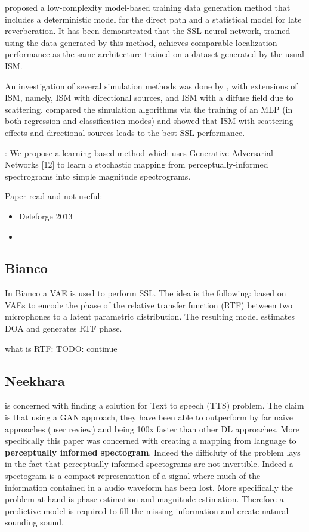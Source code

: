 \documentclass{article}
\begin{document}
\cite{hubner2021efficient} proposed a low-complexity model-based training data generation method that includes a deterministic model for the direct path and a statistical model for late reverberation. It has been demonstrated that the SSL neural network, trained using the data generated by this method, achieves comparable localization performance as the same architecture trained on a dataset generated by the usual ISM.

An investigation of several simulation methods was done by \cite{gelderblom2021synthetic}, with extensions of ISM, namely, ISM with directional sources, and ISM with a diffuse field due to scattering. \cite{gelderblom2021synthetic} compared the simulation algorithms via the training of an MLP (in both regression and classification modes) and showed that ISM with scattering effects and directional sources leads to the best SSL performance.

\cite{neekhara2019expediting} : We propose a learning-based method which uses Generative Adversarial Networks [12] to learn a stochastic mapping from perceptually-informed spectrograms into simple magnitude spectrograms.

Paper read and not useful:

\begin{itemize}
    \item Deleforge 2013 \cite{deleforge2013variational}
    \item 
\end{itemize}

\subsection{Bianco}

In Bianco a VAE is used to perform SSL. The idea is the following: based on VAEs to encode the phase of the relative transfer function (RTF) between two microphones to a latent parametric distribution. The resulting model estimates DOA and generates RTF phase.

what is RTF: TODO: continue

\subsection{Neekhara}

\cite{neekhara2019expediting} is concerned with finding a solution for Text to speech (TTS) problem. The claim is that using a GAN approach, they have been able to outperform by far naive approaches (user review) and being 100x faster than other DL approaches. More specifically this paper was concerned with creating a mapping from language to \textbf{perceptually informed spectogram}. Indeed the difficluty of the problem lays in the fact that perceptually informed spectograms are not invertible. Indeed a spectogram is a compact representation of a signal where much of the information contained in a audio waveform has been lost. More specifically the problem at hand is phase estimation and magnitude estimation. Therefore a predictive model is required to fill the missing information and create natural sounding sound.
\end{document}

